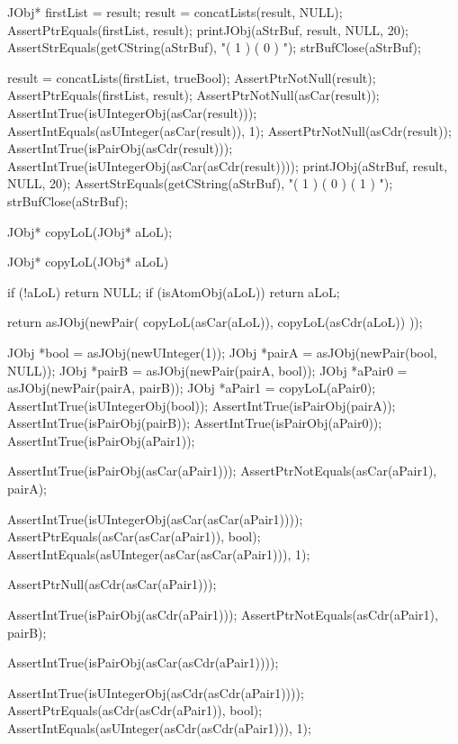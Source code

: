   JObj* firstList = result;
  result = concatLists(result, NULL);
  AssertPtrEquals(firstList, result);
  printJObj(aStrBuf, result, NULL, 20);
  AssertStrEquals(getCString(aStrBuf), "( 1 ) ( 0 )  ");
  strBufClose(aStrBuf);
  
  result = concatLists(firstList, trueBool);
  AssertPtrNotNull(result);
  AssertPtrEquals(firstList, result);
  AssertPtrNotNull(asCar(result));
  AssertIntTrue(isUIntegerObj(asCar(result)));
  AssertIntEquals(asUInteger(asCar(result)), 1);
  AssertPtrNotNull(asCdr(result));
  AssertIntTrue(isPairObj(asCdr(result)));
  AssertIntTrue(isUIntegerObj(asCar(asCdr(result))));
  printJObj(aStrBuf, result, NULL, 20);
  AssertStrEquals(getCString(aStrBuf), "( 1 ) ( 0 ) ( 1 )  ");
  strBufClose(aStrBuf);
\stopCTest
\stopTestCase
\stopTestSuite

\startTestSuite[copyLoL]

\startCHeader
JObj* copyLoL(JObj* aLoL);
\stopCHeader

\startCCode
JObj* copyLoL(JObj* aLoL) {
  if (!aLoL) return NULL;
  if (isAtomObj(aLoL)) return aLoL;

  return asJObj(newPair(
    copyLoL(asCar(aLoL)),
    copyLoL(asCdr(aLoL))
  ));
}
\stopCCode


\startCTest
  JObj *bool   = asJObj(newUInteger(1));
  JObj *pairA  = asJObj(newPair(bool, NULL));
  JObj *pairB  = asJObj(newPair(pairA, bool));
  JObj *aPair0 = asJObj(newPair(pairA, pairB));
  JObj *aPair1 = copyLoL(aPair0);
  AssertIntTrue(isUIntegerObj(bool));
  AssertIntTrue(isPairObj(pairA));
  AssertIntTrue(isPairObj(pairB));
  AssertIntTrue(isPairObj(aPair0));
  AssertIntTrue(isPairObj(aPair1));

  AssertIntTrue(isPairObj(asCar(aPair1)));
  AssertPtrNotEquals(asCar(aPair1), pairA);

  AssertIntTrue(isUIntegerObj(asCar(asCar(aPair1))));
  AssertPtrEquals(asCar(asCar(aPair1)), bool);
  AssertIntEquals(asUInteger(asCar(asCar(aPair1))), 1);

  AssertPtrNull(asCdr(asCar(aPair1)));

  AssertIntTrue(isPairObj(asCdr(aPair1)));
  AssertPtrNotEquals(asCdr(aPair1), pairB);

  AssertIntTrue(isPairObj(asCar(asCdr(aPair1))));

  AssertIntTrue(isUIntegerObj(asCdr(asCdr(aPair1))));
  AssertPtrEquals(asCdr(asCdr(aPair1)), bool);
  AssertIntEquals(asUInteger(asCdr(asCdr(aPair1))), 1);
\stopCTest
\stopTestCase
\stopTestSuite


